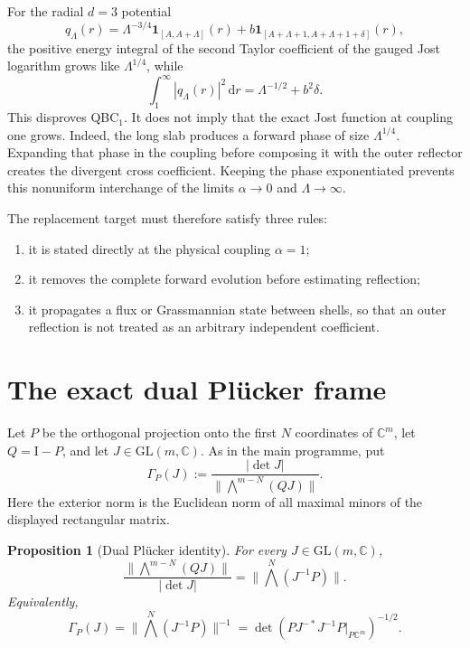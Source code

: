 \documentclass[11pt]{article}
\newcommand{\C}{\mathbb C}
\newcommand{\Id}{\mathrm I}
\newcommand{\dd}{\,\mathrm d}
\newtheorem{proposition}{Proposition}[section]
\theoremstyle{definition}
\begin{document}
For the radial $d=3$ potential
\begin{equation}
 q_\Lambda(r)=\Lambda^{-3/4}\mathbf 1_{[A,A+\Lambda]}(r)
 +b\mathbf 1_{[A+\Lambda+1,A+\Lambda+1+\delta]}(r),
 \label{eq:two-slab-potential}
\end{equation}
the positive energy integral of the second Taylor coefficient of the gauged
Jost logarithm grows like $\Lambda^{1/4}$, while
\begin{equation}
 \int_1^\infty |q_\Lambda(r)|^2\dd r
 =\Lambda^{-1/2}+b^2\delta.
 \label{eq:two-slab-cost}
\end{equation}
This disproves QBC$_1$.  It does not imply that the exact Jost function at
coupling one grows.  Indeed, the long slab produces a forward phase of size
$\Lambda^{1/4}$.  Expanding that phase in the coupling before composing it
with the outer reflector creates the divergent cross coefficient.  Keeping
the phase exponentiated prevents this nonuniform interchange of the limits
$\alpha\to0$ and $\Lambda\to\infty$.

The replacement target must therefore satisfy three rules:
\begin{enumerate}[label=(\roman*),leftmargin=*]
 \item it is stated directly at the physical coupling $\alpha=1$;
 \item it removes the complete forward evolution before estimating reflection;
 \item it propagates a flux or Grassmannian state between shells, so that an
 outer reflection is not treated as an arbitrary independent coefficient.
\end{enumerate}

\section{The exact dual Pl\"ucker frame}

Let $P$ be the orthogonal projection onto the first $N$ coordinates of
$\C^m$, let $Q=\Id-P$, and let $J\in\mathrm{GL}(m,\C)$.  As in the main
programme, put
\begin{equation}
 \Gamma_P(J)
 :=\frac{|\det J|}
 {\|\bigwedge^{m-N}(QJ)\|}.
 \label{eq:Gamma-def}
\end{equation}
Here the exterior norm is the Euclidean norm of all maximal minors of the
displayed rectangular matrix.

\begin{proposition}[Dual Pl\"ucker identity]
\label{prop:dual-plucker}
For every $J\in\mathrm{GL}(m,\C)$,
\begin{equation}
 \frac{\|\bigwedge^{m-N}(QJ)\|}{|\det J|}
 =\|\bigwedge^N(J^{-1}P)\|.
 \label{eq:dual-plucker}
\end{equation}
Equivalently,
\begin{equation}
 \Gamma_P(J)
 =\|\bigwedge^N(J^{-1}P)\|^{-1}
 =\det\!\left(PJ^{-*}J^{-1}P\big|_{P\C^m}\right)^{-1/2}.
 \label{eq:Gamma-inverse-frame}
\end{equation}
\end{proposition}
\end{document}
